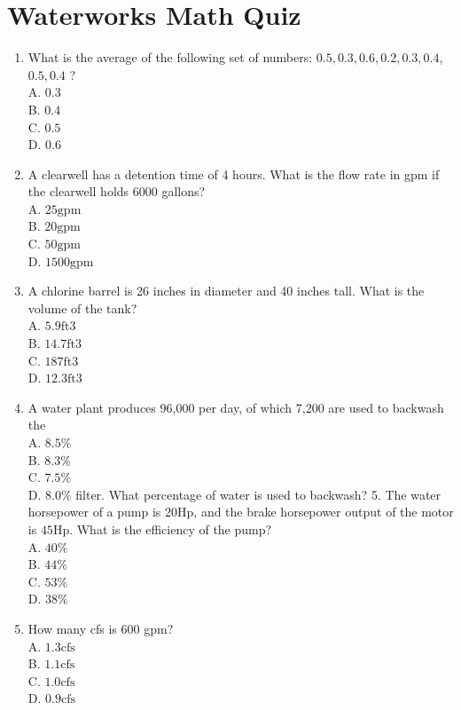 \documentclass[10pt]{article}
\begin{document}
\section{Waterworks Math Quiz}
\begin{enumerate}
  \item What is the average of the following set of numbers: $0.5,0.3,0.6,0.2,0.3,0.4$, $0.5,0.4$ ?\\
A. $0.3$\\
B. $0.4$\\
C. $0.5$\\
D. $0.6$

  \item A clearwell has a detention time of 4 hours. What is the flow rate in gpm if the clearwell holds 6000 gallons?\\
A. $25 \mathrm{gpm}$\\
B. $20 \mathrm{gpm}$\\
C. $50 \mathrm{gpm}$\\
D. $1500 \mathrm{gpm}$

  \item A chlorine barrel is 26 inches in diameter and 40 inches tall. What is the volume of the tank?\\
A. $5.9 \mathrm{ft} 3$\\
B. $14.7 \mathrm{ft} 3$\\
C. $187 \mathrm{ft} 3$\\
D. $12.3 \mathrm{ft} 3$

  \item A water plant produces 96,000 per day, of which 7,200 are used to backwash the\\
A. $8.5 \%$\\
B. $8.3 \%$\\
C. $7.5 \%$\\
D. $8.0 \%$ filter. What percentage of water is used to backwash? 5. The water horsepower of a pump is $20 \mathrm{Hp}$, and the brake horsepower output of the motor is $45 \mathrm{Hp}$. What is the efficiency of the pump?\\
A. $40 \%$\\
B. $44 \%$\\
C. $53 \%$\\
D. $38 \%$

  \item How many cfs is 600 gpm?\\
A. $1.3 \mathrm{cfs}$\\
B. $1.1 \mathrm{cfs}$\\
C. $1.0 \mathrm{cfs}$\\
D. $0.9 \mathrm{cfs}$


\end{enumerate}
\end{document}
